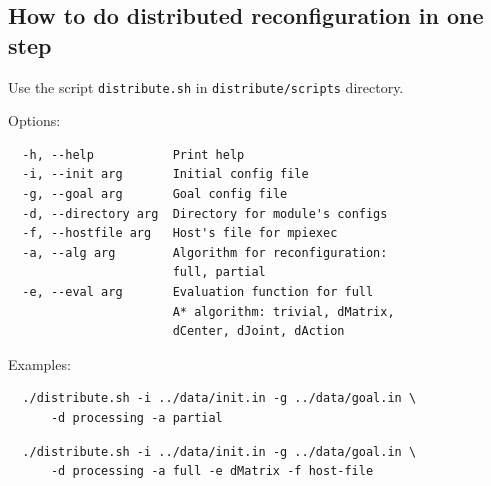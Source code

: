 \documentclass[
  printed, %
  oneside, %
  notable,   %
  nolof,     %
  nolot,     %
]{fithesis3}
\begin{document}
\subsection*{How to do distributed reconfiguration in one step}

Use the script \texttt{distribute.sh} in \texttt{distribute/scripts} directory. 

Options: 

\begin{verbatim}
  -h, --help           Print help
  -i, --init arg       Initial config file
  -g, --goal arg       Goal config file
  -d, --directory arg  Directory for module's configs
  -f, --hostfile arg   Host's file for mpiexec
  -a, --alg arg        Algorithm for reconfiguration: 
                       full, partial
  -e, --eval arg       Evaluation function for full 
                       A* algorithm: trivial, dMatrix, 
                       dCenter, dJoint, dAction
\end{verbatim}
Examples:

\begin{verbatim}
  ./distribute.sh -i ../data/init.in -g ../data/goal.in \
      -d processing -a partial
\end{verbatim}

\begin{verbatim}
  ./distribute.sh -i ../data/init.in -g ../data/goal.in \
      -d processing -a full -e dMatrix -f host-file
\end{verbatim}



\printbibliography[heading=bibintoc] %
\end{document}

